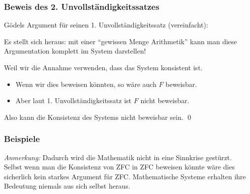 \documentclass[onlymath]{beamer}
\begin{document}
\begin{frame}\frametitle{Beweis des 2. Unvollständigkeitssatzes}

\alert{Gödels Argument für seinen 1. Unvollständigkeitssatz (vereinfacht):}

Es stellt sich heraus: mit einer "`gewissen Menge Arithmetik"' kann man diese Argumentation komplett im System darstellen!\medskip\pause

\pause\bigskip

\alert{Weil wir die Annahme verwenden, dass das System konsistent ist.}
\begin{itemize}
\item Wenn wir dies beweisen könnten, so wäre auch $F$ beweisbar.
\item Aber laut 1. Unvollständigkeitssatz ist $F$ nicht beweisbar.
\end{itemize}
Also kann die Konsistenz des Systems nicht beweisbar sein. \qed

\end{frame}

\begin{frame}\frametitle{Beispiele}

\bigskip\pause

\bigskip\pause

\emph{Anmerkung:} Dadurch wird die Mathematik nicht in eine Sinnkrise gestürzt. Selbst wenn
man die Konsistenz von ZFC in ZFC beweisen könnte wäre dies sicherlich kein starkes Argument für ZFC. Mathematische Systeme erhalten ihre Bedeutung niemals aus sich selbst heraus.

\end{frame}
\end{document}
